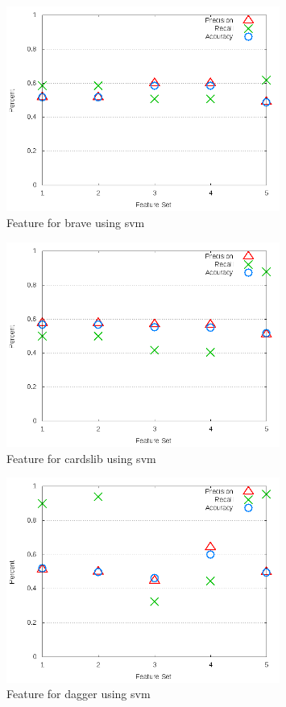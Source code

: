 \begin{figure}[!t]
\centering
\includegraphics[width=0.8\textwidth]{images/svm/test_3/brave_sample_range.png}
\caption{Feature for brave using \gls{svm}}
\label{fig:test_3_brave_svm}
\end{figure}

\begin{figure}[!t]
\centering
\includegraphics[width=0.8\textwidth]{images/svm/test_3/cardslib_sample_range.png}
\caption{Feature for cardslib using \gls{svm}}
\label{fig:test_3_cardslib_svm}
\end{figure}

\begin{figure}[!t]
\centering
\includegraphics[width=0.8\textwidth]{images/svm/test_3/dagger_sample_range.png}
\caption{Feature for dagger using \gls{svm}}
\label{fig:test_3_dagger_svm}
\end{figure}

